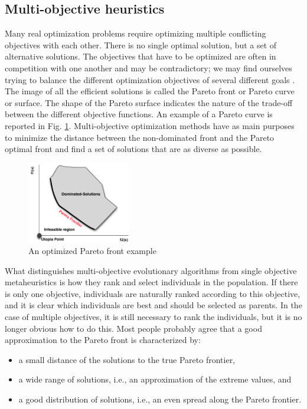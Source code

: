 \documentclass{report}
\begin{document}
\subsection{Multi-objective heuristics}

Many real optimization problems require optimizing multiple conflicting objectives with each other. There is no single optimal solution, but a set of alternative solutions. The objectives that have to be optimized are often in competition with one another and may be contradictory; we may find ourselves trying to balance the different optimization objectives of several different goals \cite{Harman2010} \cite{el2014local}. The image of all the efficient solutions is called the Pareto front or Pareto curve or surface. The shape of the Pareto surface indicates the nature of the trade-off between the different objective functions. An example of a Pareto curve is reported in Fig. \ref{fig:pareto1}. Multi-objective optimization methods have as main purposes to minimize the distance between the non-dominated front and the Pareto optimal front and find a set of solutions that are as diverse as possible. 

\begin{figure}[h]
\centering
\includegraphics[width=0.4\textwidth]{./images/paretofront.png}
\caption{An optimized Pareto front example}
\label{fig:pareto1}
\end{figure}

What distinguishes multi-objective evolutionary algorithms from single objective metaheuristics is how they rank and select individuals in the population. If there is only one objective, individuals are naturally ranked according to this objective, and it is clear which individuals are best and should be selected as
parents. In the case of multiple objectives, it is still necessary to rank the individuals, but it is no longer obvious how to do this. Most people probably agree that a good approximation to the Pareto front is characterized by:

\begin{itemize}
\item  a small distance of the solutions to the true Pareto frontier,
\item  a wide range of solutions, i.e., an approximation
of the extreme values, and
\item a good distribution of solutions, i.e., an even
spread along the Pareto frontier.
\end{itemize}
\end{document}
